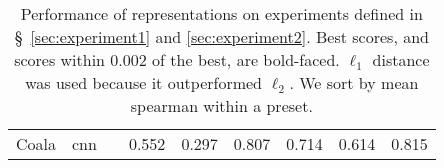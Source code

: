 \begin{table}[ht]
\begin{tabular}{rlcrrrrrr}
Coala \cite{drossos:icml:2020} & cnn &                                   &          0.552 &           0.297 &              0.807 &             0.714 &              0.614 &                 0.815 \\
 \end{tabular}
  \caption{Performance of representations on experiments defined in \S~\ref{sec:experiment1} and \ref{sec:experiment2}. Best scores, and scores within 0.002 of the best, are bold-faced. $\ell_1$ distance was used because it outperformed $\ell_2$. We sort by mean spearman within a preset.
  }
  \label{tab:distance-eval}
\end{table}
